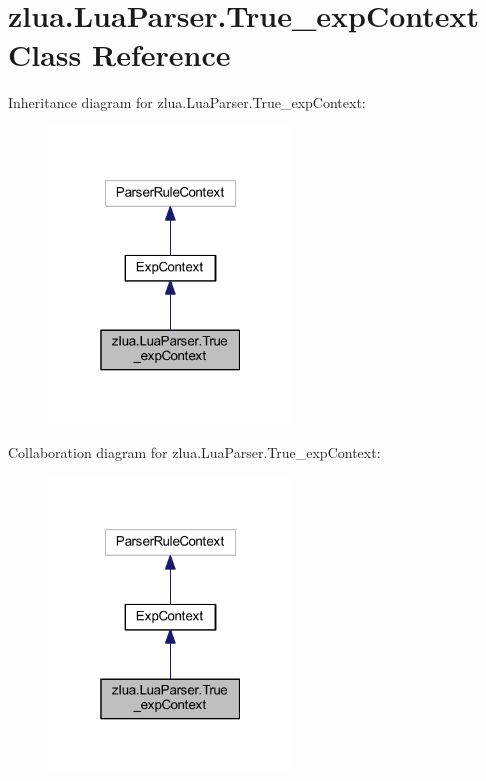 \hypertarget{classzlua_1_1_lua_parser_1_1_true__exp_context}{}\section{zlua.\+Lua\+Parser.\+True\+\_\+exp\+Context Class Reference}
\label{classzlua_1_1_lua_parser_1_1_true__exp_context}


Inheritance diagram for zlua.\+Lua\+Parser.\+True\+\_\+exp\+Context\+:
\nopagebreak
\begin{figure}[H]
\begin{center}
\leavevmode
\includegraphics[width=184pt]{classzlua_1_1_lua_parser_1_1_true__exp_context__inherit__graph}
\end{center}
\end{figure}


Collaboration diagram for zlua.\+Lua\+Parser.\+True\+\_\+exp\+Context\+:
\nopagebreak
\begin{figure}[H]
\begin{center}
\leavevmode
\includegraphics[width=184pt]{classzlua_1_1_lua_parser_1_1_true__exp_context__coll__graph}
\end{center}
\end{figure}
